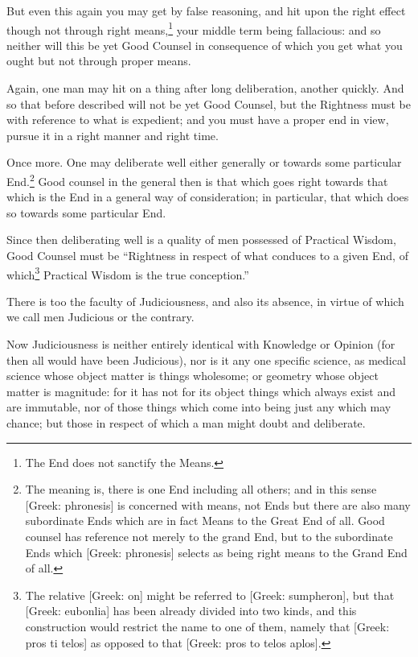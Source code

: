 But even this again you may get by false reasoning, and hit upon the right
effect though not through right means,\footnote{The End does not sanctify the Means.}
your middle term being fallacious: and so neither will this be yet Good Counsel
in consequence of which you get what you ought but not through proper means.

Again, one man may hit on a thing after long deliberation, another quickly. And
so that before described will not be yet Good Counsel, but the Rightness must
be with reference to what is expedient; and you must have a proper end in view,
pursue it in a right manner and right time.

Once more. One may deliberate well either generally or towards some particular
End.\footnote{The meaning is, there is one End including all others; and in this sense
[Greek: phronesis] is concerned with means, not Ends but there are also many
subordinate Ends which are in fact Means to the Great End of all. Good counsel
has reference not merely to the grand End, but to the subordinate Ends which
[Greek: phronesis] selects as being right means to the Grand End of all.}
Good counsel in the general then is that which goes right towards that which is
the End in a general way of consideration; in particular, that which does so
towards some particular End.

Since then deliberating well is a quality of men possessed of Practical Wisdom,
Good Counsel must be “Rightness in respect of what conduces to a given
End, of which\footnote{The relative [Greek: on] might be referred to [Greek: sumpheron], but that
[Greek: eubonlia] has been already divided into two kinds, and this
construction would restrict the name to one of them, namely that [Greek: pros
ti telos] as opposed to that [Greek: pros to telos aplos].}
Practical Wisdom is the true conception.”


There is too the faculty of Judiciousness, and also its absence, in virtue of
which we call men Judicious or the contrary.

Now Judiciousness is neither entirely identical with Knowledge or Opinion (for
then all would have been Judicious), nor is it any one specific science, as
medical science whose object matter is things wholesome; or geometry whose
object matter is magnitude: for it has not for its object things which always
exist and are immutable, nor of those things which come into being just any
which may chance; but those in respect of which a man might doubt and
deliberate.

